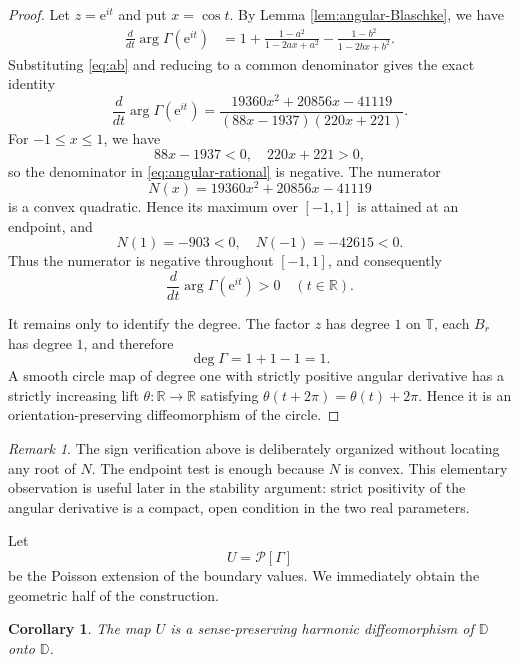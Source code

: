 \documentclass[11pt,reqno]{amsart}
\numberwithin{equation}{section}
\newtheorem{corollary}[theorem]{Corollary}
\theoremstyle{definition}
\theoremstyle{remark}
\newtheorem{remark}[theorem]{Remark}
\newcommand{\D}{\mathbb D}
\newcommand{\T}{\mathbb T}
\newcommand{\R}{\mathbb R}
\newcommand{\Poisson}{\mathcal P}
\newcommand{\e}{\mathrm e}
\begin{document}
\begin{proof}
Let $z=\e^{it}$ and put $x=\cos t$.  By Lemma \ref{lem:angular-Blaschke}, we have
\begin{align}
 \frac{d}{dt}\arg\Gamma(\e^{it})
 &=1+\frac{1-a^2}{1-2ax+a^2}
   -\frac{1-b^2}{1-2bx+b^2}.
\end{align}
Substituting \eqref{eq:ab} and reducing to a common denominator gives the exact identity
\begin{equation}\label{eq:angular-rational}
 \frac{d}{dt}\arg\Gamma(\e^{it})
 =\frac{19360x^2+20856x-41119}
 {(88x-1937)(220x+221)}.
\end{equation}
For $-1\le x\le1$, we have
\[
 88x-1937<0,
 \quad
 220x+221>0,
\]
so the denominator in \eqref{eq:angular-rational} is negative.  The numerator
\[
 N(x)=19360x^2+20856x-41119
\]
is a convex quadratic.  Hence its maximum over $[-1,1]$ is attained at an endpoint, and
\[
 N(1)=-903<0,
 \quad
 N(-1)=-42615<0.
\]
Thus the numerator is negative throughout $[-1,1]$, and consequently
\begin{equation}\label{eq:angular-positive}
 \frac{d}{dt}\arg\Gamma(\e^{it})>0
 \quad(t\in\R).
\end{equation}

It remains only to identify the degree.  The factor $z$ has degree $1$ on $\T$, each $B_r$ has degree $1$, and therefore
\[
 \deg\Gamma=1+1-1=1.
\]
A smooth circle map of degree one with strictly positive angular derivative has a strictly increasing lift $\theta:\R\to\R$ satisfying $\theta(t+2\pi)=\theta(t)+2\pi$.  Hence it is an orientation-preserving diffeomorphism of the circle.
\end{proof}

\begin{remark}\label{rem:not-delicate}
{\rm The sign verification above is deliberately organized without locating any root of $N$.  The endpoint test is enough because $N$ is convex.  This elementary observation is useful later in the stability argument: strict positivity of the angular derivative is a compact, open condition in the two real parameters.}
\end{remark}

Let
\begin{equation}\label{eq:U}
 U=\Poisson[\Gamma]
\end{equation}
be the Poisson extension of the boundary values.  We immediately obtain the geometric half of the construction.

\begin{corollary}\label{cor:U-diffeo}
The map $U$ is a sense-preserving harmonic diffeomorphism of $\D$ onto $\D$.
\end{corollary}
\end{document}
